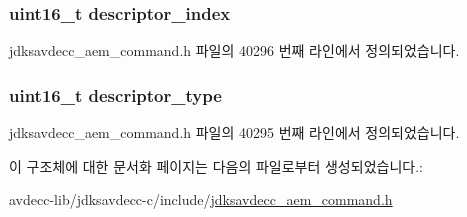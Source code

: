 \subsubsection[{\texorpdfstring{descriptor\+\_\+index}{descriptor_index}}]{\setlength{\rightskip}{0pt plus 5cm}uint16\+\_\+t descriptor\+\_\+index}\hypertarget{structjdksavdecc__aem__command__authenticate__response_a042bbc76d835b82d27c1932431ee38d4}{}\label{structjdksavdecc__aem__command__authenticate__response_a042bbc76d835b82d27c1932431ee38d4}


jdksavdecc\+\_\+aem\+\_\+command.\+h 파일의 40296 번째 라인에서 정의되었습니다.

\subsubsection[{\texorpdfstring{descriptor\+\_\+type}{descriptor_type}}]{\setlength{\rightskip}{0pt plus 5cm}uint16\+\_\+t descriptor\+\_\+type}\hypertarget{structjdksavdecc__aem__command__authenticate__response_ab7c32b6c7131c13d4ea3b7ee2f09b78d}{}\label{structjdksavdecc__aem__command__authenticate__response_ab7c32b6c7131c13d4ea3b7ee2f09b78d}


jdksavdecc\+\_\+aem\+\_\+command.\+h 파일의 40295 번째 라인에서 정의되었습니다.



이 구조체에 대한 문서화 페이지는 다음의 파일로부터 생성되었습니다.\+:\begin{DoxyCompactItemize}
\item 
avdecc-\/lib/jdksavdecc-\/c/include/\hyperlink{jdksavdecc__aem__command_8h}{jdksavdecc\+\_\+aem\+\_\+command.\+h}\end{DoxyCompactItemize}
